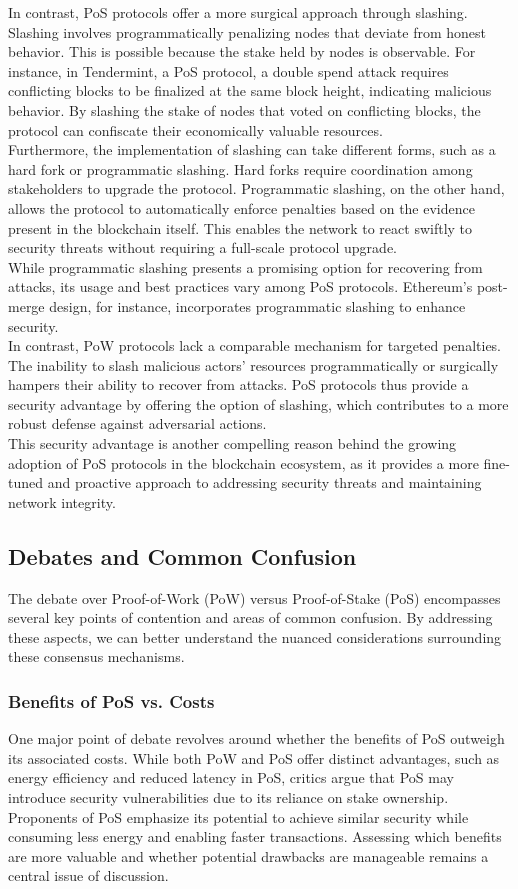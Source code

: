 In contrast, PoS protocols offer a more surgical approach through slashing. Slashing involves programmatically penalizing nodes that deviate from honest behavior. This is possible because the stake held by nodes is observable. For instance, in Tendermint, a PoS protocol, a double spend attack requires conflicting blocks to be finalized at the same block height, indicating malicious behavior. By slashing the stake of nodes that voted on conflicting blocks, the protocol can confiscate their economically valuable resources.\\
Furthermore, the implementation of slashing can take different forms, such as a hard fork or programmatic slashing. Hard forks require coordination among stakeholders to upgrade the protocol. Programmatic slashing, on the other hand, allows the protocol to automatically enforce penalties based on the evidence present in the blockchain itself. This enables the network to react swiftly to security threats without requiring a full-scale protocol upgrade.\\
While programmatic slashing presents a promising option for recovering from attacks, its usage and best practices vary among PoS protocols. Ethereum's post-merge design, for instance, incorporates programmatic slashing to enhance security.\\
In contrast, PoW protocols lack a comparable mechanism for targeted penalties. The inability to slash malicious actors' resources programmatically or surgically hampers their ability to recover from attacks. PoS protocols thus provide a security advantage by offering the option of slashing, which contributes to a more robust defense against adversarial actions.\\
This security advantage is another compelling reason behind the growing adoption of PoS protocols in the blockchain ecosystem, as it provides a more fine-tuned and proactive approach to addressing security threats and maintaining network integrity.

\subsection{Debates and Common Confusion}
The debate over Proof-of-Work (PoW) versus Proof-of-Stake (PoS) encompasses several key points of contention and areas of common confusion. By addressing these aspects, we can better understand the nuanced considerations surrounding these consensus mechanisms.

\subsubsection{Benefits of PoS vs. Costs}
One major point of debate revolves around whether the benefits of PoS outweigh its associated costs. While both PoW and PoS offer distinct advantages, such as energy efficiency and reduced latency in PoS, critics argue that PoS may introduce security vulnerabilities due to its reliance on stake ownership. Proponents of PoS emphasize its potential to achieve similar security while consuming less energy and enabling faster transactions. Assessing which benefits are more valuable and whether potential drawbacks are manageable remains a central issue of discussion.

